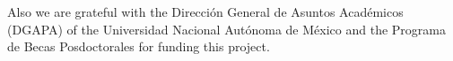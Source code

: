 \documentclass[times,twocolumn,final,authoryear]{elsarticle}
\begin{document}
Also we are grateful with the Direcci\'on General de Asuntos Acad\'emicos (DGAPA) of the Universidad Nacional Aut\'onoma de M\'exico and the Programa de Becas Posdoctorales for funding this project.



\end{document}
